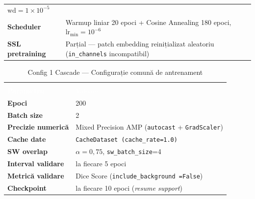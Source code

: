 \documentclass[12pt, a4paper]{report}
\begin{document}
\begin{table}[H]
\begin{tabular}{>{\bfseries}p{5.5cm} p{8.5cm}}
                                             $\text{wd}=1\times10^{-5}$ \\
\rowcolor{white}     Scheduler             & Warmup liniar 20 epoci
                                             + Cosine Annealing 180 epoci,
                                             $\text{lr}_{\min}=10^{-6}$ \\
\rowcolor{lightblue} SSL pretraining       & Parțial — patch embedding
                                             reinițializat aleatoriu
                                             (\texttt{in\_channels}
                                             incompatibil) \\
\end{tabular}
\end{table}

\vspace{6pt}

\begin{table}[H]
\centering
\renewcommand{\arraystretch}{1.3}
\caption{Config 1 Cascade — Configurație comună de antrenament}
\label{tab:config1_training}
\begin{tabular}{>{\bfseries}p{5.5cm} p{8.5cm}}
\multicolumn{2}{>{\columncolor{darkblue}}c}{%
    \textbf{\textcolor{white}{Configurație comună de antrenament}}} \\
\rowcolor{darkblue}
\textcolor{white}{Parametru} & \textcolor{white}{Valoare} \\
\rowcolor{lightblue} Epoci               & 200 \\
\rowcolor{white}     Batch size          & 2 \\
\rowcolor{lightblue} Precizie numerică   & Mixed Precision AMP
                                           (\texttt{autocast}
                                           + \texttt{GradScaler}) \\
\rowcolor{white}     Cache date          & \texttt{CacheDataset
                                           (cache\_rate=1.0)} \\
\rowcolor{lightblue} SW overlap          & $\alpha = 0{,}75$,
                                           \texttt{sw\_batch\_size}=4 \\
\rowcolor{white}     Interval validare   & la fiecare 5 epoci \\
\rowcolor{lightblue} Metrică validare    & Dice Score
                                           (\texttt{include\_background
                                           =False}) \\
\rowcolor{white}     Checkpoint          & la fiecare 10 epoci
                                           (\textit{resume support}) \\
\end{tabular}
\end{table}
\end{document}
